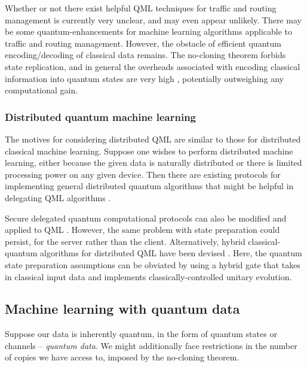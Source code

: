 Whether or not there exist helpful QML techniques for traffic and routing management is currently very unclear, and may even appear unlikely. There may be some quantum-enhancements for machine learning algorithms applicable to traffic and routing management. However, the obstacle of efficient quantum encoding/decoding of classical data remains. The no-cloning theorem forbids state replication, and in general the overheads associated with encoding classical information into quantum states are very high \cite{bib:giovannetti2008quantum, bib:giovannetti2008architectures}, potentially outweighing any computational gain.

\subsubsection{Distributed quantum machine learning}

The motives for considering distributed QML are similar to those for distributed classical machine learning. Suppose one wishes to perform distributed machine learning, either because the given data is naturally distributed or there is limited processing power on any given device. Then there are existing protocols for implementing general distributed quantum algorithms that might be helpful in delegating QML algorithms \cite{bib:beals2013efficient}.

Secure delegated quantum computational protocols \cite{bib:joe} can also be modified and applied to QML \cite{bib:sheng2017distributed, bib:bang2015protocol}. However, the same problem with state preparation could persist, for the server rather than the client. Alternatively, hybrid classical-quantum algorithms for distributed QML have been devised \cite{bib:yoo2014quantum}. Here, the quantum state preparation assumptions can be obviated by using a hybrid gate that takes in classical input data and implements classically-controlled unitary evolution.

\subsection{Machine learning with quantum data} \label{sec:ml_quantum_data}

Suppose our data is inherently quantum, in the form of quantum states or channels -- \textit{quantum data}. We might additionally face restrictions in the number of copies we have access to, imposed by the no-cloning theorem.

